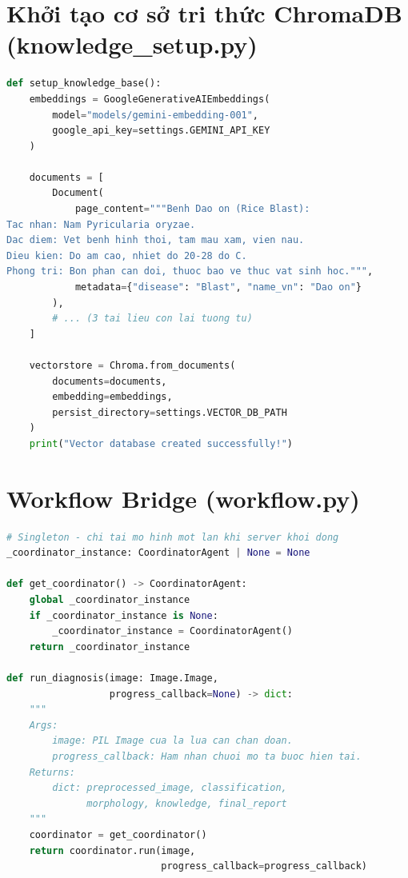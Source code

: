 \documentclass[13pt,a4paper]{extreport}
\begin{document}
\section{Khởi tạo cơ sở tri thức ChromaDB (knowledge\_setup.py)}
\begin{lstlisting}[language=Python, caption={src/core/knowledge\_setup.py --- Lập chỉ mục tài liệu bệnh học vào ChromaDB}, label={lst:knowledge}]
def setup_knowledge_base():
    embeddings = GoogleGenerativeAIEmbeddings(
        model="models/gemini-embedding-001",
        google_api_key=settings.GEMINI_API_KEY
    )

    documents = [
        Document(
            page_content="""Benh Dao on (Rice Blast):
Tac nhan: Nam Pyricularia oryzae.
Dac diem: Vet benh hinh thoi, tam mau xam, vien nau.
Dieu kien: Do am cao, nhiet do 20-28 do C.
Phong tri: Bon phan can doi, thuoc bao ve thuc vat sinh hoc.""",
            metadata={"disease": "Blast", "name_vn": "Dao on"}
        ),
        # ... (3 tai lieu con lai tuong tu)
    ]

    vectorstore = Chroma.from_documents(
        documents=documents,
        embedding=embeddings,
        persist_directory=settings.VECTOR_DB_PATH
    )
    print("Vector database created successfully!")
\end{lstlisting}

\section{Workflow Bridge (workflow.py)}
\begin{lstlisting}[language=Python, caption={src/core/workflow.py --- Bridge giữa tầng UI/API và tầng Agent}, label={lst:workflow}]
# Singleton - chi tai mo hinh mot lan khi server khoi dong
_coordinator_instance: CoordinatorAgent | None = None

def get_coordinator() -> CoordinatorAgent:
    global _coordinator_instance
    if _coordinator_instance is None:
        _coordinator_instance = CoordinatorAgent()
    return _coordinator_instance

def run_diagnosis(image: Image.Image,
                  progress_callback=None) -> dict:
    """
    Args:
        image: PIL Image cua la lua can chan doan.
        progress_callback: Ham nhan chuoi mo ta buoc hien tai.
    Returns:
        dict: preprocessed_image, classification,
              morphology, knowledge, final_report
    """
    coordinator = get_coordinator()
    return coordinator.run(image,
                           progress_callback=progress_callback)
\end{lstlisting}
\end{document}
